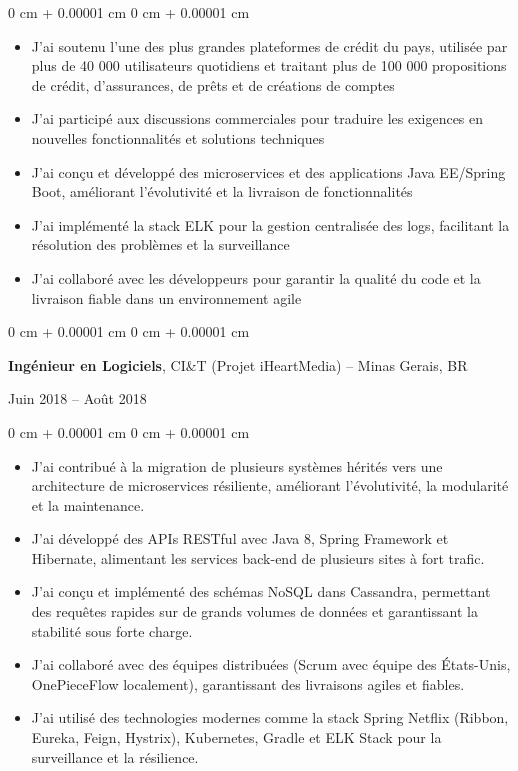 \documentclass[10pt, letterpaper]{article}
\newenvironment{highlights}{
    \begin{itemize}[
        topsep=0.10 cm,
        parsep=0.10 cm,
        partopsep=0pt,
        itemsep=0pt,
        leftmargin=0 cm + 10pt
    ]
}{
    \end{itemize}
} %
\newenvironment{onecolentry}{
    \begin{adjustwidth}{
        0 cm + 0.00001 cm
    }{
        0 cm + 0.00001 cm
    }
}{
    \end{adjustwidth}
} %
\newenvironment{twocolentry}[2][]{
    \onecolentry
    \def\secondColumn{#2}
    \setcolumnwidth{\fill, 4.5 cm}
    \begin{paracol}{2}
}{
    \switchcolumn \raggedleft \secondColumn
    \end{paracol}
    \endonecolentry
} %
\begin{document}
        \begin{onecolentry}
            \begin{highlights}
                \item J'ai soutenu l'une des plus grandes plateformes de crédit du pays, utilisée par plus de 40 000 utilisateurs quotidiens et traitant plus de 100 000 propositions de crédit, d'assurances, de prêts et de créations de comptes
                \item J'ai participé aux discussions commerciales pour traduire les exigences en nouvelles fonctionnalités et solutions techniques
                \item J'ai conçu et développé des microservices et des applications Java EE/Spring Boot, améliorant l'évolutivité et la livraison de fonctionnalités
                \item J'ai implémenté la stack ELK pour la gestion centralisée des logs, facilitant la résolution des problèmes et la surveillance
                \item J'ai collaboré avec les développeurs pour garantir la qualité du code et la livraison fiable dans un environnement agile
            \end{highlights}
        \end{onecolentry}

        \vspace{0.2 cm}

        \begin{twocolentry}{
            Juin 2018 – Août 2018
        }
            \textbf{Ingénieur en Logiciels}, CI\&T (Projet iHeartMedia) -- Minas Gerais, BR
        \end{twocolentry}

        \vspace{0.10 cm}
        
        \begin{onecolentry}
            \begin{highlights}
                \item J'ai contribué à la migration de plusieurs systèmes hérités vers une architecture de microservices résiliente, améliorant l'évolutivité, la modularité et la maintenance.
                \item J'ai développé des APIs RESTful avec Java 8, Spring Framework et Hibernate, alimentant les services back-end de plusieurs sites à fort trafic.
                \item J'ai conçu et implémenté des schémas NoSQL dans Cassandra, permettant des requêtes rapides sur de grands volumes de données et garantissant la stabilité sous forte charge.
                \item J'ai collaboré avec des équipes distribuées (Scrum avec équipe des États-Unis, OnePieceFlow localement), garantissant des livraisons agiles et fiables.
                \item J'ai utilisé des technologies modernes comme la stack Spring Netflix (Ribbon, Eureka, Feign, Hystrix), Kubernetes, Gradle et ELK Stack pour la surveillance et la résilience.
            \end{highlights}
        \end{onecolentry}
\end{document}
